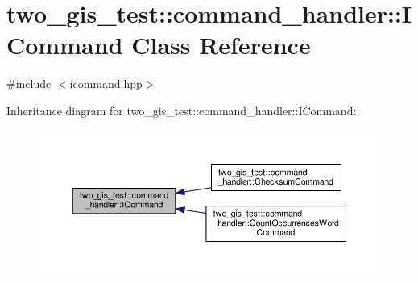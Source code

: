\hypertarget{classtwo__gis__test_1_1command__handler_1_1_i_command}{}\section{two\+\_\+gis\+\_\+test\+:\+:command\+\_\+handler\+:\+:I\+Command Class Reference}
\label{classtwo__gis__test_1_1command__handler_1_1_i_command}


{\ttfamily \#include $<$icommand.\+hpp$>$}



Inheritance diagram for two\+\_\+gis\+\_\+test\+:\+:command\+\_\+handler\+:\+:I\+Command\+:\nopagebreak
\begin{figure}[H]
\begin{center}
\leavevmode
\includegraphics[width=350pt]{classtwo__gis__test_1_1command__handler_1_1_i_command__inherit__graph}
\end{center}
\end{figure}

